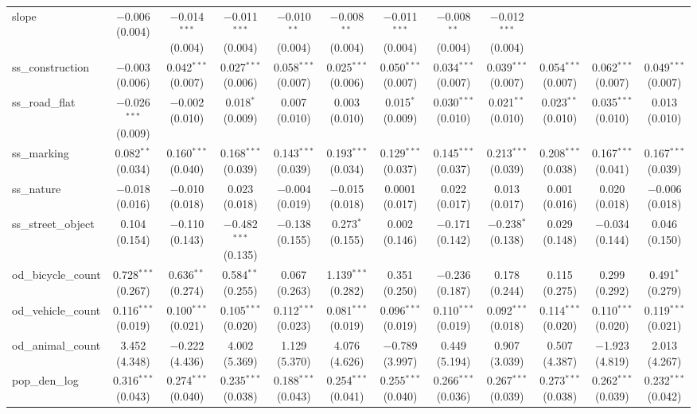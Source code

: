 \begin{table}[!htbp]
\begin{tabular}{@{\extracolsep{1pt}}lccccccccccc}
  slope & $-$0.006 (0.004) & $-$0.014$^{***}$ (0.004) & $-$0.011$^{***}$ (0.004) & $-$0.010$^{**}$ (0.004) & $-$0.008$^{**}$ (0.004) & $-$0.011$^{***}$ (0.004) & $-$0.008$^{**}$ (0.004) & $-$0.012$^{***}$ (0.004) &  &  &  \\ 
  ss\_construction & $-$0.003 (0.006) & 0.042$^{***}$ (0.007) & 0.027$^{***}$ (0.006) & 0.058$^{***}$ (0.007) & 0.025$^{***}$ (0.006) & 0.050$^{***}$ (0.007) & 0.034$^{***}$ (0.007) & 0.039$^{***}$ (0.007) & 0.054$^{***}$ (0.007) & 0.062$^{***}$ (0.007) & 0.049$^{***}$ (0.007) \\ 
  ss\_road\_flat & $-$0.026$^{***}$ (0.009) & $-$0.002 (0.010) & 0.018$^{*}$ (0.009) & 0.007 (0.010) & 0.003 (0.010) & 0.015$^{*}$ (0.009) & 0.030$^{***}$ (0.010) & 0.021$^{**}$ (0.010) & 0.023$^{**}$ (0.010) & 0.035$^{***}$ (0.010) & 0.013 (0.010) \\ 
  ss\_marking & 0.082$^{**}$ (0.034) & 0.160$^{***}$ (0.040) & 0.168$^{***}$ (0.039) & 0.143$^{***}$ (0.039) & 0.193$^{***}$ (0.034) & 0.129$^{***}$ (0.037) & 0.145$^{***}$ (0.037) & 0.213$^{***}$ (0.039) & 0.208$^{***}$ (0.038) & 0.167$^{***}$ (0.041) & 0.167$^{***}$ (0.039) \\ 
  ss\_nature & $-$0.018 (0.016) & $-$0.010 (0.018) & 0.023 (0.018) & $-$0.004 (0.019) & $-$0.015 (0.018) & 0.0001 (0.017) & 0.022 (0.017) & 0.013 (0.017) & 0.001 (0.016) & 0.020 (0.018) & $-$0.006 (0.018) \\ 
  ss\_street\_object & 0.104 (0.154) & $-$0.110 (0.143) & $-$0.482$^{***}$ (0.135) & $-$0.138 (0.155) & 0.273$^{*}$ (0.155) & 0.002 (0.146) & $-$0.171 (0.142) & $-$0.238$^{*}$ (0.138) & 0.029 (0.148) & $-$0.034 (0.144) & 0.046 (0.150) \\ 
  od\_bicycle\_count & 0.728$^{***}$ (0.267) & 0.636$^{**}$ (0.274) & 0.584$^{**}$ (0.255) & 0.067 (0.263) & 1.139$^{***}$ (0.282) & 0.351 (0.250) & $-$0.236 (0.187) & 0.178 (0.244) & 0.115 (0.275) & 0.299 (0.292) & 0.491$^{*}$ (0.279) \\ 
  od\_vehicle\_count & 0.116$^{***}$ (0.019) & 0.100$^{***}$ (0.021) & 0.105$^{***}$ (0.020) & 0.112$^{***}$ (0.023) & 0.081$^{***}$ (0.019) & 0.096$^{***}$ (0.019) & 0.110$^{***}$ (0.019) & 0.092$^{***}$ (0.018) & 0.114$^{***}$ (0.020) & 0.110$^{***}$ (0.020) & 0.119$^{***}$ (0.021) \\ 
  od\_animal\_count & 3.452 (4.348) & $-$0.222 (4.436) & 4.002 (5.369) & 1.129 (5.370) & 4.076 (4.626) & $-$0.789 (3.997) & 0.449 (5.194) & 0.907 (3.039) & 0.507 (4.387) & $-$1.923 (4.819) & 2.013 (4.267) \\ 
  pop\_den\_log & 0.316$^{***}$ (0.043) & 0.274$^{***}$ (0.040) & 0.235$^{***}$ (0.038) & 0.188$^{***}$ (0.043) & 0.254$^{***}$ (0.041) & 0.255$^{***}$ (0.040) & 0.266$^{***}$ (0.036) & 0.267$^{***}$ (0.039) & 0.273$^{***}$ (0.038) & 0.262$^{***}$ (0.039) & 0.232$^{***}$ (0.042) \\ 

\end{tabular}
\end{table}
